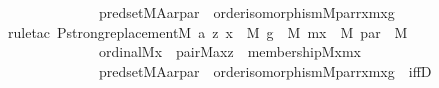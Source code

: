 \begin{isabellebody}
\ \ \ \ \ \ \ \ \ \ \ \ \ pred{\isacharunderscore}{\kern0pt}set{\isacharparenleft}{\kern0pt}{\isacharhash}{\kern0pt}{\isacharhash}{\kern0pt}M{\isacharcomma}{\kern0pt}A{\isacharcomma}{\kern0pt}a{\isacharcomma}{\kern0pt}r{\isacharcomma}{\kern0pt}par{\isacharparenright}{\kern0pt}\ {\isasymand}\ order{\isacharunderscore}{\kern0pt}isomorphism{\isacharparenleft}{\kern0pt}{\isacharhash}{\kern0pt}{\isacharhash}{\kern0pt}M{\isacharcomma}{\kern0pt}par{\isacharcomma}{\kern0pt}r{\isacharcomma}{\kern0pt}x{\isacharcomma}{\kern0pt}mx{\isacharcomma}{\kern0pt}g{\isacharparenright}{\kern0pt}{\isacharparenright}{\kern0pt}{\isachardoublequoteclose}\isanewline
%
\isadelimproof
\isanewline
\ \ %
\endisadelimproof
%
\isatagproof
{}\isamarkupfalse%
{\isacharparenleft}{\kern0pt}rule{\isacharunderscore}{\kern0pt}tac\ P{\isacharequal}{\kern0pt}{\isachardoublequoteopen}strong{\isacharunderscore}{\kern0pt}replacement{\isacharparenleft}{\kern0pt}{\isacharhash}{\kern0pt}{\isacharhash}{\kern0pt}M{\isacharcomma}{\kern0pt}\ {\isasymlambda}a\ z{\isachardot}{\kern0pt}\ {\isasymexists}x\ {\isasymin}\ M{\isachardot}{\kern0pt}\ {\isasymexists}g\ {\isasymin}\ M{\isachardot}{\kern0pt}\ {\isasymexists}mx\ {\isasymin}\ M{\isachardot}{\kern0pt}\ {\isasymexists}par\ {\isasymin}\ M{\isachardot}{\kern0pt}\isanewline
\ \ \ \ \ \ \ \ \ \ \ \ \ ordinal{\isacharparenleft}{\kern0pt}{\isacharhash}{\kern0pt}{\isacharhash}{\kern0pt}M{\isacharcomma}{\kern0pt}x{\isacharparenright}{\kern0pt}\ {\isasymand}\ pair{\isacharparenleft}{\kern0pt}{\isacharhash}{\kern0pt}{\isacharhash}{\kern0pt}M{\isacharcomma}{\kern0pt}a{\isacharcomma}{\kern0pt}x{\isacharcomma}{\kern0pt}z{\isacharparenright}{\kern0pt}\ {\isasymand}\ membership{\isacharparenleft}{\kern0pt}{\isacharhash}{\kern0pt}{\isacharhash}{\kern0pt}M{\isacharcomma}{\kern0pt}x{\isacharcomma}{\kern0pt}mx{\isacharparenright}{\kern0pt}\ {\isasymand}\isanewline
\ \ \ \ \ \ \ \ \ \ \ \ \ pred{\isacharunderscore}{\kern0pt}set{\isacharparenleft}{\kern0pt}{\isacharhash}{\kern0pt}{\isacharhash}{\kern0pt}M{\isacharcomma}{\kern0pt}A{\isacharcomma}{\kern0pt}a{\isacharcomma}{\kern0pt}r{\isacharcomma}{\kern0pt}par{\isacharparenright}{\kern0pt}\ {\isasymand}\ order{\isacharunderscore}{\kern0pt}isomorphism{\isacharparenleft}{\kern0pt}{\isacharhash}{\kern0pt}{\isacharhash}{\kern0pt}M{\isacharcomma}{\kern0pt}par{\isacharcomma}{\kern0pt}r{\isacharcomma}{\kern0pt}x{\isacharcomma}{\kern0pt}mx{\isacharcomma}{\kern0pt}g{\isacharparenright}{\kern0pt}{\isacharparenright}{\kern0pt}{\isachardoublequoteclose}\ \ iffD{}{\isacharparenright}{\kern0pt}\isanewline

\end{isabellebody}
